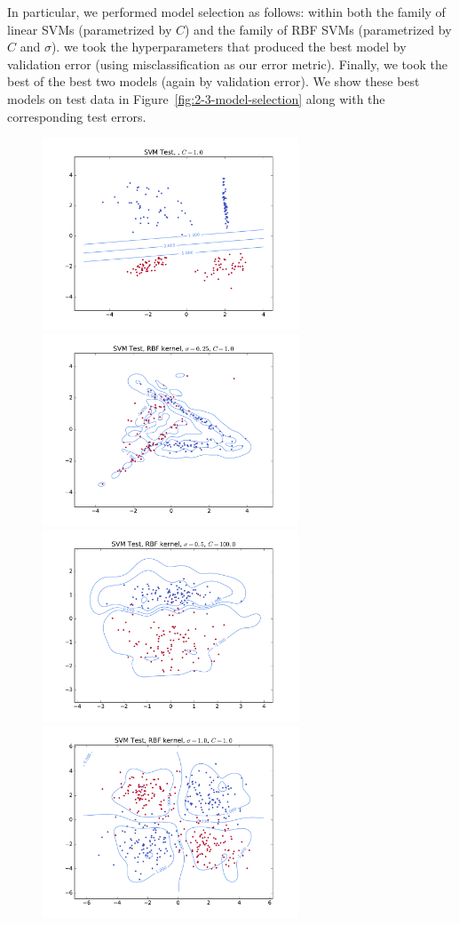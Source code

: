 \documentclass{article}
\begin{document}
\begin{multicols}{2}
In particular, we performed model selection as follows:
within both the family of linear SVMs (parametrized by $C$)
and the family of RBF SVMs (parametrized by $C$ and $\sigma$).
we took the hyperparameters that produced the best model by validation error
(using misclassification as our error metric).
Finally, we took the best of the best two models (again by validation error).
We show these best models on test data in Figure~\ref{fig:2-3-model-selection}
along with the corresponding test errors.

\begin{figure}[t]
   \centering
   \includegraphics[width=3in]{img/p2-3-d1-c001/test.pdf}
   \includegraphics[width=3in]{img/p2-3-d2-c1-rbf025/test.pdf}
   \includegraphics[width=3in]{img/p2-3-d3-c100-rbf025/test.pdf}
   \includegraphics[width=3in]{img/p2-3-d4-c1-rbf10/test.pdf}

\end{figure}
\end{multicols}
\end{document}
